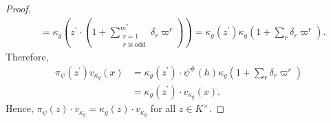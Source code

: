 \documentclass[10pt,a4paper]{amsart}
\begin{document}
\begin{proof}
\begin{align*}
&= \kappa_g \left (z^\prime \cdot (1 + \sum\limits_{\substack{r = 1  \\    r \text{ is odd} }}^{m^*} \delta_r \varpi^r) \right) = \kappa_g(z^\prime)  \kappa_g(1 + \sum\limits_{r} \delta_r \varpi^r). 
\end{align*}
Therefore,
\begin{align*}
 \pi_\psi(z^\prime) v_{\kappa_g}(x) &= \kappa_g(z^\prime) \cdot \psi^\#(h) \kappa_g(1 + \sum\limits_{r} \delta_r \varpi^r) \\
 &= \kappa_g(z^\prime) \cdot v_{\kappa_g}(x).
\end{align*}
Hence, $\pi_\psi(z) \cdot v_{\kappa_g}= \kappa_g(z) \cdot v_{\kappa_g}$ for all $z \in K^\times$.
\end{proof}
\end{document}

